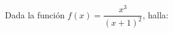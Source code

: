 \documentclass[addpoints,spanish, 12pt,a4paper]{exam}
\renewcommand*\half{.5}
\begin{document}
\begin{questions}










\question Dada la función $f(x) = \dfrac{x^3}{(x+1)^2}$, halla:
\begin{parts}

\end{parts}
\end{questions}
\end{document}
